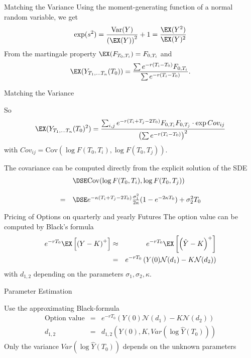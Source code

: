 



{Matching the Variance}
Using the moment-generating function of a normal random variable, we get
$$
\exp (s^2) = \frac{\textrm{Var}(Y)}{\left(\EX (Y)\right)^2} + 1  = \frac{\EX(Y^2)}{\EX(Y)^2}
$$
From the martingale property
$\EX (F_{T_0,T_i}) =  F_{0,T_i} $ and
$$ \EX (Y_{T_1, \ldots T_n}(T_0))  =
\frac{\sum e^{-r(T_i-T_0)} F_{0,T_i}}{\sum e^{-r(T_i-T_0)}}.$$


{Matching the Variance}

So
$$
\EX (Y_{T_1, \ldots T_n}(T_0)^2)
=  \frac{\sum_{i, j}e^{-r(T_i+T_j-2T_0)} F_{0,T_i}F_{0,T_j}\cdot \exp Cov_{ij}}{\left(\sum e^{-r(T_i-T_0)}\right)^2}
$$ with
$Cov_{ij} = \textrm{Cov}(\log F(T_0,T_i), \log F(T_0,T_j))$.

The covariance can be computed directly from the explicit solution of the SDE
$$\begin{array}{ll}
& \DSE \textrm{Cov}(\log F(T_0,T_i), \log F(T_0,T_j)) \\*[12pt]
 = & \DSE
 e^{-\kappa(T_i+T_j-2T_0)}\frac{\sigma_1^2}{2\kappa}(1-e^{-2\kappa T_0})+\sigma_2^2 T_0
\end{array}
$$


{Pricing of Options on quarterly and yearly Futures}
The option value can be computed by Black's formula
\begin{eqnarray*}
e^{-rT_0}\EX\left[\left(Y-K\right)^+\right]&\approx & e^{-rT_0}\EX\left[\left(\hat{Y}-K\right)^+\right]\\
& = &e^{-rT_0}\left(Y(0)\mathcal{N}(d_1) - K\mathcal{N}(d_2)\right)
\end{eqnarray*}
with $d_{1,2}$ depending on the parameters $\sigma_1, \sigma_2, \kappa$.




{Parameter Estimation}






	Use the approximating Black-formula
    \begin{eqnarray*}
        \textrm{Option value}&=&    e^{-rT_0}\left(Y(0)\mathcal{N} (d_1)-K\mathcal{N} (d_2) \right)
\\
        d_{1,2} & = & d_{1,2}\left(Y(0),K,Var(\log \hat{Y}(T_0))\right)
    \end{eqnarray*}
        Only the variance $Var(\log \hat{Y}(T_0))$ depends on the unknown parameters



